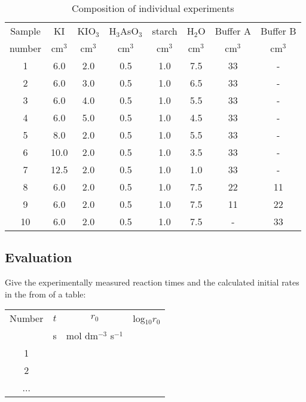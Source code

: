 \begin{table}[H]
\caption{Composition of individual experiments}
\begin{tabular}{|c|c|c|c|c|c|c|c|}
\hline
Sample& KI & KIO$_3$ & H$_3$AsO$_3$ & starch & H$_2$O & Buffer A & Buffer B \\

number & cm$^3$ & cm$^3$ & cm$^3$ & cm$^3$ & cm$^3$ & cm$^3$ & cm$^3$ \\

\hline
1 & 6.0 & 2.0 & 0.5 & 1.0 & 7.5 & 33 & - \\

\hline
2 & 6.0 & 3.0 & 0.5 & 1.0 & 6.5 & 33 & - \\

\hline
3 & 6.0 & 4.0 & 0.5 & 1.0 & 5.5 & 33 & - \\

\hline
4 & 6.0 & 5.0 & 0.5 & 1.0 & 4.5 & 33 & - \\

\hline
5 & 8.0 & 2.0 & 0.5 & 1.0 & 5.5 & 33 & - \\

\hline
6 & 10.0 & 2.0 & 0.5 & 1.0 & 3.5 & 33 & - \\

\hline
7 & 12.5 & 2.0 & 0.5 & 1.0 & 1.0 & 33 & - \\

\hline
8 & 6.0 & 2.0 & 0.5 & 1.0 & 7.5 & 22 & 11 \\

\hline
9 & 6.0 & 2.0 & 0.5 & 1.0 & 7.5 & 11 & 22 \\

\hline
10 & 6.0 & 2.0 & 0.5 & 1.0 & 7.5 & - & 33 \\

\hline

\end{tabular}
\end{table}

\subsection{Evaluation}

Give the experimentally measured reaction times and the calculated initial rates in the from of a table:

\begin{table}[H]
\begin{tabular}{|c|c|c|c|}
\hline
Number & $t$ & $r_0$ & log$_{10} r_0$ \\

   & s & mol dm$^{-3}$ s$^{-1}$ &  \\

\hline
1 &   &   &   \\

\hline
2 &   &   &   \\

\hline
... &   &   &   \\

\hline
\end{tabular}
\end{table}

